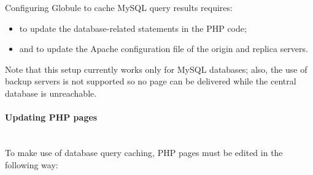 \documentclass[10pt,a4paper]{article}
\makeatletter
\newenvironment{p}{\@open{P}{}}{\@close{P}}
\newenvironment{p}{}{\par}
\makeatother
\begin{document}
\begin{p}
Configuring Globule to cache MySQL query results requires:
\end{p}

\begin{p}
\begin{itemize}
\item to update the database-related statements in the PHP code;
\item and to update the Apache configuration file of the origin and
  replica servers.
\end{itemize}
\end{p}

\begin{p}
Note that this setup currently works only for MySQL databases; also,
the use of backup servers is not supported so no page can be delivered
while the central database is unreachable.
\end{p}




\paragraph{Updating PHP pages}~\\

\begin{p}
To make use of database query caching, PHP pages must be edited in the
following way:
\end{p}
\end{document}
